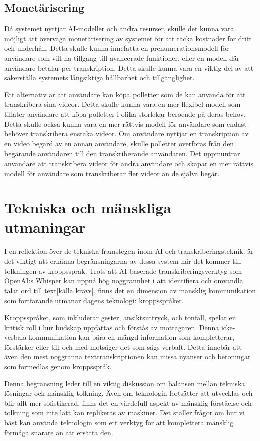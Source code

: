 \subsection{Monetärisering}
Då systemet nyttjar AI-modeller och andra resurser, skulle det kunna vara
möjligt att överväga monetärisering av systemet för att täcka kostnader för
drift och underhåll. Detta skulle kunna innefatta en prenumerationsmodell för
användare som vill ha tillgång till avancerade funktioner, eller en modell
där användare betalar per transkription. Detta skulle kunna vara en viktig del
av att säkerställa systemets långsiktiga hållbarhet och tillgänglighet.

Ett alternativ är att användare kan köpa polletter som de kan använda för att
transkribera sina videor. Detta skulle kunna vara en mer flexibel modell som
tillåter användare att köpa polletter i olika storlekar beroende på deras
behov. Detta skulle också kunna vara en mer rättvis modell för användare som
endast behöver transkribera enstaka videor. Om användare nyttjar en
transkription av en video begärd av en annan användare, skulle polletter
överföras från den begärande användaren till den transkriberande användaren.
Det uppmuntrar användare att transkribera videor för andra användare och
skapar en mer rättvis modell för användare som transkriberar fler videor än de
själva begär.

\section{Tekniska och mänskliga utmaningar}
I en reflektion över de tekniska framstegen inom AI och transkriberingsteknik,
är det viktigt att erkänna begränsningarna av dessa system när det kommer till
tolkningen av kroppsspråk. Trots att AI-baserade transkriberingsverktyg som
OpenAI:s Whisper kan uppnå hög noggrannhet i att identifiera och omvandla
talat ord till text[källa krävs], finns det en dimension av mänsklig
kommunikation som fortfarande utmanar dagens teknologi: kroppsspråket.

Kroppsspråket, som inkluderar gester, ansiktsuttryck, och tonfall, spelar en
kritisk roll i hur budskap uppfattas och förstås av mottagaren. Denna
icke-verbala kommunikation kan bära en mängd information som kompletterar,
förstärker eller till och med motsäger det som sägs verbalt. Detta innebär att
även den mest noggranna texttranskriptionen kan missa nyanser och betoningar
som förmedlas genom kroppsspråk.

Denna begränsning leder till en viktig diskussion om balansen mellan tekniska
lösningar och mänsklig tolkning. Även om teknologin fortsätter att utvecklas
och blir allt mer sofistikerad, finns det en värdefull aspekt av mänsklig
förståelse och tolkning som inte lätt kan replikeras av maskiner. Det ställer
frågor om hur vi bäst kan använda teknologin som ett verktyg för att
komplettera mänsklig förmåga snarare än att ersätta den.


